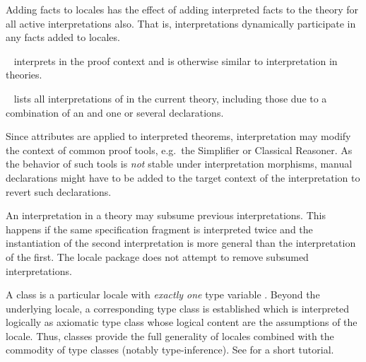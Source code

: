 \begin{isabellebody}
\begin{isamarkuptext}
\begin{description}
  Adding facts to locales has the effect of adding interpreted facts
  to the theory for all active interpretations also.  That is,
  interpretations dynamically participate in any facts added to
  locales.

  \item \hyperlink{command.interpret}{\mbox{}}~
  interprets  in the proof context and is otherwise
  similar to interpretation in theories.

  \item \hyperlink{command.print-interps}{\mbox{}}~ lists all
  interpretations of  in the current theory, including
  those due to a combination of an \hyperlink{command.interpretation}{\mbox{}} and
  one or several \hyperlink{command.sublocale}{\mbox{}} declarations.

  \end{description}

  \begin{warn}
    Since attributes are applied to interpreted theorems,
    interpretation may modify the context of common proof tools, e.g.\
    the Simplifier or Classical Reasoner.  As the behavior of such
    tools is \emph{not} stable under interpretation morphisms, manual
    declarations might have to be added to the target context of the
    interpretation to revert such declarations.
  \end{warn}

  \begin{warn}
    An interpretation in a theory may subsume previous
    interpretations.  This happens if the same specification fragment
    is interpreted twice and the instantiation of the second
    interpretation is more general than the interpretation of the
    first.  The locale package does not attempt to remove subsumed
    interpretations.
  \end{warn}%
\end{isamarkuptext}%
\isamarkuptrue%
%
\isamarkuptrue%
%
\begin{isamarkuptext}%
A class is a particular locale with \emph{exactly one} type variable
  \isa{{\isasymalpha}}.  Beyond the underlying locale, a corresponding type class
  is established which is interpreted logically as axiomatic type
  class \cite{Wenzel:1997:TPHOL} whose logical content are the
  assumptions of the locale.  Thus, classes provide the full
  generality of locales combined with the commodity of type classes
  (notably type-inference).  See \cite{isabelle-classes} for a short
  tutorial.


\end{isamarkuptext}
\end{isabellebody}
